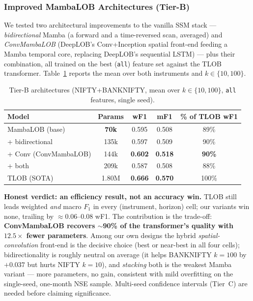 \documentclass[11pt]{article}
\begin{document}
\subsubsection{Improved MambaLOB Architectures (Tier-B)}
We tested two architectural improvements to the vanilla SSM stack --- \emph{bidirectional} Mamba (a forward
and a time-reversed scan, averaged) and \emph{ConvMambaLOB} (DeepLOB's Conv+Inception spatial front-end
feeding a Mamba temporal core, replacing DeepLOB's sequential LSTM) --- plus their combination, all trained
on the best (\texttt{all}) feature set against the TLOB transformer. Table~\ref{tab:tierb} reports the mean
over both instruments and $k\in\{10,100\}$.
\begin{table}[h]
\centering
\caption{Tier-B architectures (NIFTY+BANKNIFTY, mean over $k\in\{10,100\}$, \texttt{all} features, single seed).}
\label{tab:tierb}
\begin{tabular}{@{}lcccc@{}}
\toprule
Model & Params & wF1 & mF1 & \% of TLOB wF1 \\
\midrule
MambaLOB (base)       & \textbf{70k}  & 0.595 & 0.508 & 89\% \\
\;+ bidirectional     & 135k & 0.597 & 0.509 & 90\% \\
\;+ Conv (ConvMambaLOB) & 144k & \textbf{0.602} & \textbf{0.518} & \textbf{90\%} \\
\;+ both              & 209k & 0.587 & 0.508 & 88\% \\
TLOB (SOTA)           & 1.80M & \textbf{0.666} & \textbf{0.570} & 100\% \\
\bottomrule
\end{tabular}
\end{table}
\textbf{Honest verdict: an efficiency result, not an accuracy win.} TLOB still leads weighted \emph{and}
macro $F_1$ in every (instrument, horizon) cell; our variants win none, trailing by $\approx$0.06--0.08 wF1.
The contribution is the trade-off: \textbf{ConvMambaLOB recovers $\sim$90\% of the transformer's quality with
$12.5\times$ fewer parameters}. Among our own designs the hybrid \emph{spatial-convolution} front-end is the
decisive choice (best or near-best in all four cells); bidirectionality is roughly neutral on average (it
helps BANKNIFTY $k{=}100$ by $+0.037$ but hurts NIFTY $k{=}10$), and \emph{stacking} both is the weakest
Mamba variant --- more parameters, no gain, consistent with mild overfitting on the single-seed,
one-month NSE sample. Multi-seed confidence intervals (Tier~C) are needed before claiming significance.
\end{document}
